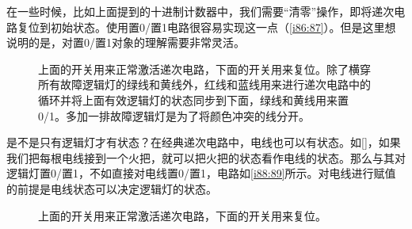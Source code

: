 在一些时候，比如上面提到的十进制计数器中，我们需要“清零”操作，即将递次电路复位到初始状态。使用置0/置1电路很容易实现这一点（\autoref{i86:87}）。但是这里想说明的是，对置0/置1对象的理解需要非常灵活。

\begin{figure}[!h]
\begin{center}
\end{center}
\caption{上面的开关用来正常激活递次电路，下面的开关用来复位。除了横穿所有故障逻辑灯的绿线和黄线外，红线和蓝线用来进行递次电路中的循环并将上面有效逻辑灯的状态同步到下面，绿线和黄线用来置0/1。多加一排故障逻辑灯是为了将颜色冲突的线分开。}
\label{i86:87}
\end{figure}

是不是只有逻辑灯才有状态？在经典递次电路中，电线也可以有状态。如\autoref{}，如果我们把每根电线接到一个火把，就可以把火把的状态看作电线的状态。那么与其对逻辑灯置0/置1，不如直接对电线置0/置1，电路如\autoref{i88:89}所示。对电线进行赋值的前提是电线状态可以决定逻辑灯的状态。

\begin{figure}[!h]
\begin{center}
\end{center}
\caption{上面的开关用来正常激活递次电路，下面的开关用来复位。}
\label{i88:89}
\end{figure}

